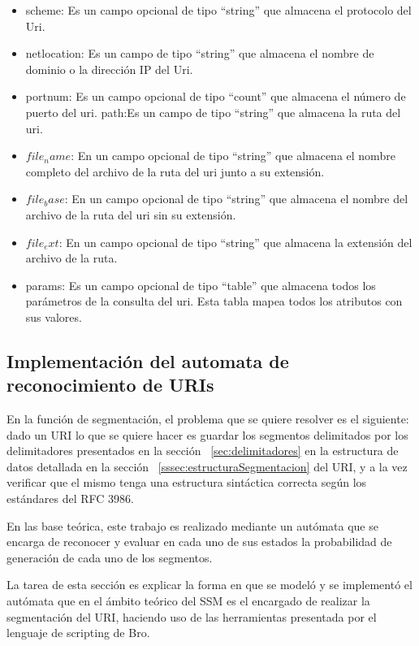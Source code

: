 \begin{itemize}
\item scheme: Es un campo opcional de tipo “string” que almacena el protocolo del Uri.

\item netlocation: Es un campo de tipo “string” que almacena el nombre de dominio o la dirección IP del Uri.

\item portnum: Es un campo opcional de tipo “count”  que almacena el número de puerto del uri.
path:Es un campo de tipo “string” que almacena la ruta del uri.

\item $file_name$: En un campo opcional de tipo “string” que almacena el nombre completo  del archivo de la ruta del uri junto a su extensión.

\item $file_base$: En un campo opcional de tipo “string” que almacena el nombre  del archivo de la ruta del uri sin su extensión.

\item $file_ext$: En un campo opcional de tipo “string” que almacena la extensión del archivo de la ruta.

\item params: Es un campo opcional de tipo “table” que almacena todos los parámetros de la consulta del uri. Esta tabla mapea todos los atributos con sus valores.
\end{itemize}

\subsection{Implementación del automata de reconocimiento de URIs}

En la función de segmentación, el problema que se quiere resolver es el siguiente: dado un URI lo que se quiere hacer es guardar los segmentos delimitados por los delimitadores presentados en la sección ~\ref{sec:delimitadores} en la estructura de datos detallada en la sección ~\ref{sssec:estructuraSegmentacion} del URI, y a la vez verificar que el mismo tenga una estructura sintáctica correcta según los estándares del RFC 3986. 

En las base teórica, este trabajo es realizado mediante un autómata que se encarga de reconocer y evaluar en cada uno de sus estados la probabilidad de generación de cada uno de los segmentos. 

La tarea de esta sección es explicar la forma en que se modeló y se implementó el autómata que en el ámbito teórico del SSM es el encargado de realizar la segmentación del URI, haciendo uso de las herramientas presentada por el lenguaje de scripting de Bro.

